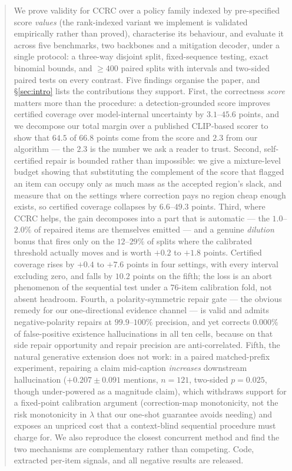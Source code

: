 \documentclass{article}
\theoremstyle{plain}
\theoremstyle{definition}
\theoremstyle{remark}
\begin{document}
\begin{abstract}
We prove validity for CCRC over a policy family indexed by pre-specified score \emph{values}
(the rank-indexed variant we implement is validated empirically rather than proved), characterise
its behaviour, and evaluate it across five
benchmarks, two backbones and a mitigation decoder, under a single protocol: a three-way
disjoint split, fixed-sequence testing, exact binomial bounds, and $\ge400$ paired splits
with intervals and two-sided paired tests on every contrast. Five findings organise the
paper, and \S\ref{sec:intro} lists the contributions they support.
First, the correctness \emph{score} matters more than the procedure: a detection-grounded
score improves certified coverage over model-internal uncertainty by $3.1$--$45.6$ points,
and we decompose our total margin over a published CLIP-based scorer to show that $64.5$ of
$66.8$ points come from the score and $2.3$ from our algorithm --- the $2.3$ is the number we
ask a reader to trust. Second, self-certified repair is bounded rather than impossible: we
give a mixture-level budget showing that substituting the complement of the score that
flagged an item can occupy only as much mass as the accepted region's slack, and measure
that on the settings where correction pays no region cheap enough exists, so certified
coverage collapses by $6.6$--$49.3$ points. Third, where CCRC helps, the gain decomposes into
a part that is automatic --- the $1.0$--$2.0\%$ of repaired items are themselves emitted --- and
a genuine \emph{dilution} bonus that fires only on the $12$--$29\%$ of splits where the
calibrated threshold actually moves and is worth $+0.2$ to $+1.8$ points. Certified coverage
rises by $+0.4$ to $+7.6$ points in four settings, with every interval excluding zero, and
falls by $10.2$ points on the fifth; the loss is an abort phenomenon of the sequential test
under a $76$-item calibration fold, not absent headroom. Fourth, a polarity-symmetric repair
gate --- the obvious remedy for our one-directional evidence channel --- is valid and admits
negative-polarity repairs at $99.9$--$100\%$ precision, and yet corrects $0.000\%$ of
false-positive existence hallucinations in all ten cells, because on that side repair
opportunity and repair precision are anti-correlated. Fifth, the natural generative extension
does not work: in a paired matched-prefix experiment, repairing a claim mid-caption
\emph{increases} downstream hallucination ($+0.207\pm0.091$ mentions, $n=121$, two-sided
$p=0.025$, though under-powered as a magnitude claim), which withdraws support for a
fixed-point calibration argument (correction-map monotonicity, not the risk monotonicity in
$\lambda$ that our one-shot guarantee avoids needing) and exposes an unpriced cost that a
context-blind sequential procedure must charge for. We also reproduce the closest concurrent
method and find the two mechanisms are complementary rather than competing. Code, extracted
per-item signals, and all negative results are released.
\end{abstract}
\end{document}
